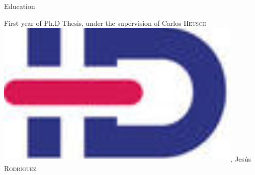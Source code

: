  \begin{rubric}{Education}
                                \entry*[2020-2021]
                            
                    
                                \entry*
                            
                    
                                \entry*[2019-2020]
                            
                    
                                \entry*
                            
                    
                                \entry*[2018-2019]
                            First year of Ph.D Thesis, under the supervision of
                        Carlos \textsc{Heusch}\href{https://www.idref.fr/055838413}{\textsuperscript{\includegraphics[scale=0.025]{img/idref.png}}},
                        Jesús \textsc{Rodríguez
}
\end{rubric}
